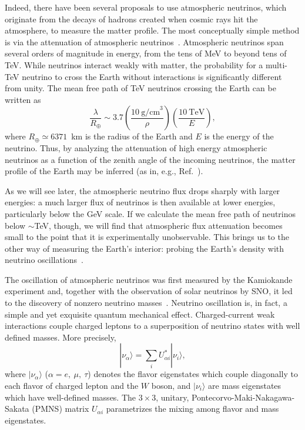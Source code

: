 Indeed, there have been several proposals to use atmospheric neutrinos, which originate from the decays of hadrons created when cosmic rays hit the atmosphere, to measure the matter profile.
The most conceptually simple method is via the attenuation of atmospheric neutrinos~\cite{DeRujula:1983ya, Wilson:1983an, Askarian:1984xrv, Borisov:1986sm, Jain:1999kp, Reynoso:2004dt, Gonzalez-Garcia:2007wfs, Agarwalla:2012uj, Ioannisian:2017chl, Donini:2018tsg}.
Atmospheric neutrinos span several orders of magnitude in energy, from the tens of MeV to beyond tens of TeV.
While neutrinos interact weakly with matter, the probability for a multi-TeV neutrino to cross the Earth without interactions is significantly different from unity.
The mean free path of TeV neutrinos crossing the Earth can be written as
\begin{equation}
  \frac{\lambda}{R_{\scriptscriptstyle\oplus}} \sim 3.7 \left(\frac{10~\text{g/cm}^3}{\rho}\right)\left(\frac{10~\text{TeV}}{E}\right),
\end{equation}
where $R_{\scriptscriptstyle\oplus}\simeq6371$~km is the radius of the Earth and $E$ is the energy of the neutrino.
Thus, by analyzing the attenuation of high energy atmospheric neutrinos as a function of the zenith angle of the incoming neutrinos, the matter profile of the Earth may be inferred (as in, e.g., Ref.~\cite{Donini:2018tsg}).

As we will see later, the atmospheric neutrino flux drops sharply with larger energies: a much larger flux of neutrinos is then available at lower energies, particularly below the GeV scale.
If we calculate the mean free path of neutrinos below ${\sim}$TeV, though, we will find that atmospheric flux attenuation becomes small to the point that it is experimentally unobservable.
This brings us to the other way of measuring the Earth's interior: probing the Earth's density with neutrino oscillations~\cite{Nicolaidis:1990jm, Ohlsson:1999um, Lindner:2002wm, Akhmedov:2005yt, Winter:2006vg, Rott:2015kwa, Winter:2015zwx, DOlivo:2020ssf, Kumar:2021faw}.


The oscillation of atmospheric neutrinos was first measured by the Kamiokande experiment and, together with the observation of solar neutrinos by SNO, it led to the discovery of nonzero neutrino masses~\cite{McDonald:2016ixn, Kajita:2016cak}.
Neutrino oscillation is, in fact, a simple and yet exquisite quantum mechanical effect. 
Charged-current weak interactions couple charged leptons to a superposition of neutrino states with well defined masses. 
More precisely,  
\begin{equation}
  |\nu_\alpha \rangle = \sum_i U_{\alpha i}^* |\nu_i \rangle,
\end{equation}
where $|\nu_\alpha \rangle$ ($\alpha = e,\ \mu,\ \tau$) denotes the flavor eigenstates which couple diagonally to each flavor of charged lepton and the $W$ boson, and $|\nu_i \rangle$ are mass eigenstates which have well-defined masses.
The $3\times3$, unitary, Pontecorvo-Maki-Nakagawa-Sakata (PMNS) matrix $U_{\alpha i}$ parametrizes the mixing among flavor and mass eigenstates.

